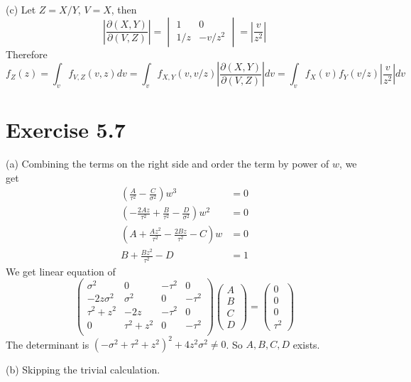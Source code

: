 \documentclass[12pt]{article}
\begin{document}
(c) Let $Z = X/Y$, $V = X$, then 
$$  \left| \frac{\partial (X, Y)}{\partial(V, Z)}\right|= \begin{vmatrix}1 & 0 \\ 1/z & -v/z^2 \end{vmatrix} = \left| \frac{v}{z^2}\right| $$
Therefore 
$$ f_Z(z) = \int_v f_{V, Z}(v,z) dv = \int_v f_{X, Y}(v,v/z)\left| \frac{\partial (X, Y)}{\partial(V, Z)}\right|dv = \int_v f_{X}(v) f_{Y}(v/z) \left| \frac{v}{z^2}\right|dv$$

\section*{Exercise 5.7}
(a) Combining the terms on the right side and order the term by power of $w$, we get
$$ \begin{aligned}
	 \left( \frac{A}{\tau^2}- \frac{C}{\sigma^2} \right) w^3 &= 0 \\
	 \left( -\frac{2Az}{\tau^2} + \frac{B}{\tau^2} - \frac{D}{\sigma^2} \right)w^2 &= 0\\
	 \left( A + \frac{Az^2}{\tau^2} - \frac{2Bz}{\tau^2} - C \right)w &= 0 \\
	 B + \frac{Bz^2}{\tau^2} - D &= 1 
\end{aligned}
$$
We get linear equation of 
$$ \begin{pmatrix}
	\sigma^2 & 0 & -\tau^2 & 0 \\
	-2z\sigma^2 & \sigma^2 & 0 & -\tau^2 \\
	\tau^2 + z^2 & -2z & -\tau^2 & 0 \\
	0 & \tau^2 + z^2 & 0 & -\tau^2 \\
\end{pmatrix}
\begin{pmatrix}
	A \\ B \\ C \\ D 
\end{pmatrix}
= 
\begin{pmatrix}
	0 \\ 0 \\ 0 \\ \tau^2
\end{pmatrix}
$$
The determinant is $(-\sigma^2 + \tau^2 + z^2)^2 + 4z^2\sigma^2 \neq 0$. So $A,B,C,D$ exists.

(b) Skipping the trivial calculation.
\end{document}
